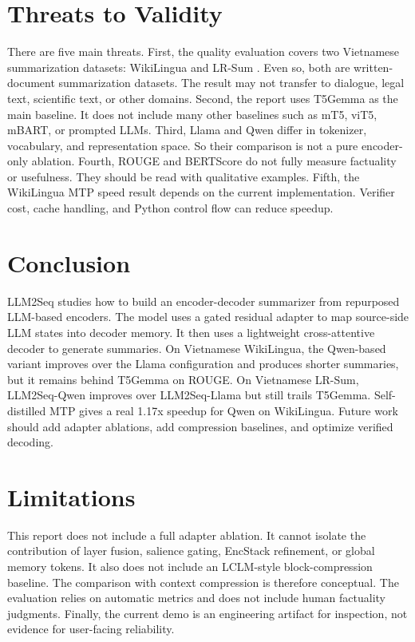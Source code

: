 \documentclass[11pt]{article}
\begin{document}
\section{Threats to Validity}
\label{sec:validity}

There are five main threats.
First, the quality evaluation covers two Vietnamese summarization datasets: WikiLingua \citep{ladhak2020wikilingua} and LR-Sum \citep{palen-michel-lignos-2023-lr}.
Even so, both are written-document summarization datasets.
The result may not transfer to dialogue, legal text, scientific text, or other domains.
Second, the report uses T5Gemma as the main baseline.
It does not include many other baselines such as mT5, viT5, mBART, or prompted LLMs.
Third, Llama and Qwen differ in tokenizer, vocabulary, and representation space.
So their comparison is not a pure encoder-only ablation.
Fourth, ROUGE and BERTScore do not fully measure factuality or usefulness.
They should be read with qualitative examples.
Fifth, the WikiLingua MTP speed result depends on the current implementation.
Verifier cost, cache handling, and Python control flow can reduce speedup.

\section{Conclusion}
\label{sec:conclusion}

LLM2Seq studies how to build an encoder-decoder summarizer from repurposed LLM-based encoders.
The model uses a gated residual adapter to map source-side LLM states into decoder memory.
It then uses a lightweight cross-attentive decoder to generate summaries.
On Vietnamese WikiLingua, the Qwen-based variant improves over the Llama configuration and produces shorter summaries, but it remains behind T5Gemma on ROUGE.
On Vietnamese LR-Sum, LLM2Seq-Qwen improves over LLM2Seq-Llama but still trails T5Gemma.
Self-distilled MTP gives a real 1.17x speedup for Qwen on WikiLingua.
Future work should add adapter ablations, add compression baselines, and optimize verified decoding.

\section*{Limitations}

This report does not include a full adapter ablation.
It cannot isolate the contribution of layer fusion, salience gating, EncStack refinement, or global memory tokens.
It also does not include an LCLM-style block-compression baseline.
The comparison with context compression is therefore conceptual.
The evaluation relies on automatic metrics and does not include human factuality judgments.
Finally, the current demo is an engineering artifact for inspection, not evidence for user-facing reliability.
\end{document}
